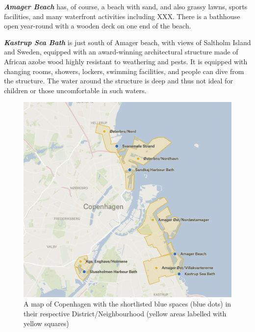 \documentclass{article}
\newcommand{\bisection}[1]{\textbf{\textit{#1}}}
\begin{document}
\bisection{Amager Beach} has, of course, a beach with sand, and also grassy lawns, sports facilities, and many waterfront activities including XXX. There is a bathhouse open year-round with a wooden deck on one end of the beach.

\bisection{Kastrup Sea Bath} is just south of Amager beach, with views of Saltholm Island and Sweden, equipped with an award-winning architectural structure made of African azobe wood highly resistant to weathering and pests. It is equipped with changing rooms, showers, lockers, swimming facilities, and people can dive from the structure. The water around the structure is deep and thus not ideal for children or those uncomfortable in such waters.

\begin{figure}[htp]
	\includegraphics[width=\textwidth]{copenhagen_blue_spaces.png}
	\caption{A map of Copenhagen with the shortlisted blue spaces (blue dots) in their respective District/Neighbourhood (yellow areas labelled with yellow squares)}
\end{figure}
\end{document}
